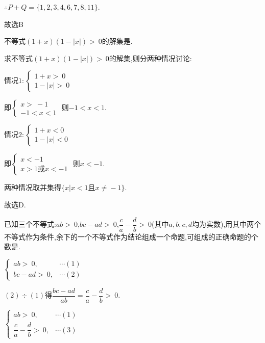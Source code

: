 \documentclass[cs4size,windows,a4paper,answers]{BHCexam}
\begin{document}
\begin{groups}
\begin{questions}[]
\begin{solution}
$\therefore P+Q=\{1,2,3,4,6,7,8,11\}$.

故选B




\end{solution}
\question[5] 不等式$(1+x)(1-|x|)\gt\ 0$的解集是.

\begin{solution}
\methodonly
求不等式$(1+x)(1-|x|)\gt\ 0$的解集,则分两种情况讨论:

情况$1:\left\{\begin{array}{l}{1+x\gt\ 0\;\;}\\{1-|x|\gt\ 0}\end{array}\right.$

即$\left\{\begin{array}{l}{x\gt\ -1}\\{-1\lt x\lt 1}\end{array}\right.$
则$-1\lt x\lt 1$.

情况$2:\left\{\begin{array}{l}{1+x\lt 0}\\{1-|x|\lt 0}\end{array}\right.$

即$\left\{\begin{array}{l}{x\lt -1}\\{x\gt1\text{或}x\lt-1}\end{array}\right.$
则$x\lt -1$.

两种情况取并集得$\{x|x\lt 1$且$x\neq{}-1\}$.

故选D.




\end{solution}
\question[5] 已知三个不等式:$ab\gt\ 0$,$bc-ad\gt\ 0$,$\dfrac{c}{a}-\dfrac{d}{b}\gt\ 0$(其中$a,b,c,d$均为实数),用其中两个不等式作为条件,余下的一个不等式作为结论组成一个命题,可组成的正确命题的个数是.

\begin{solution}
\methodonly
$\begin{cases}ab\gt\ 0, &\cdots(1)\\
bc-ad\gt\ 0,&\cdots(2)
\end{cases}$

$(2)\div(1)$得$\dfrac{bc-ad}{ab}=\dfrac{c}{a}-\dfrac{d}{b}\gt\ 0$.

$\begin{cases}
ab\gt\ 0,&\cdots(1)\\
\dfrac{c}{a}-\dfrac{d}{b}\gt\ 0,&\cdots(3)
\end{cases}$


\end{solution}
\end{questions}
\end{groups}
\end{document}
